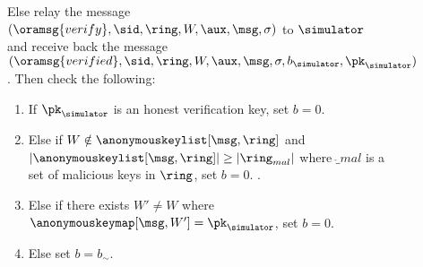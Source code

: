 \begin{figure}
\begin{tcolorbox}[left=2pt,right=2pt]
{\begin{list}{\hspace*{1pt} C}{\setlength\leftmargin{0.15in}}
					\item \label{cond:malicioussignature}Else relay the message $(\oramsg{verify}, \sid, \ring,W,\aux, \msg, \sigma)$ to $ \simulator $ and receive back the message $(\oramsg{verified}, \sid, \ring,W,\aux, \msg, \sigma, b_{\simulator}, \pk_\simulator)$.  Then check the following:
					
					\begin{enumerate}
						\item If   $ \pk_\simulator $ is an honest verification key, set $ b = 0 $. 
						\label{cond:forgery}
						
						\item Else if $ W \notin \anonymouskeylist[\msg,\ring] $ and $ |\anonymouskeylist[\msg, \ring]| \geq |\ring_{mal}| $ where $ \ring_{mal} $ is a set of malicious keys in $ \ring $, set $ b = 0 $.
						\label{cond:uniqueness}.
						
						\item Else if there exists $ W' \neq W $ where  $ \anonymouskeymap[\msg,W'] = \pk_\simulator $, set $ b = 0 $. \label{cond:differentWforsamepk} 
						\item Else set $ b = b_\sim$. \label{cond:simulatorbit}
					\end{enumerate}		
					

\end{list}}
\end{tcolorbox}
\end{figure}
